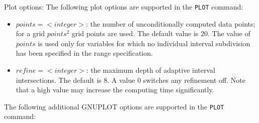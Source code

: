 Plot options:
The following plot options are supported in the \verb+PLOT+ command:

\begin{itemize}
   \item $points=<integer>$: the number of unconditionally computed
       data points; for a grid $points^2$ grid points are used.
     The default value is 20. The value of $points$ is used
     only for variables for which no individual interval
     subdivision has been specified in the range specification.
   \item $refine=<integer>$: the maximum depth of adaptive 
       interval intersections. The default is 8. A value 0 switches
       any refinement off. Note that a high value may increase the
       computing time significantly.
\end{itemize}

The following additional GNUPLOT options are supported in the \verb+PLOT+ command:

